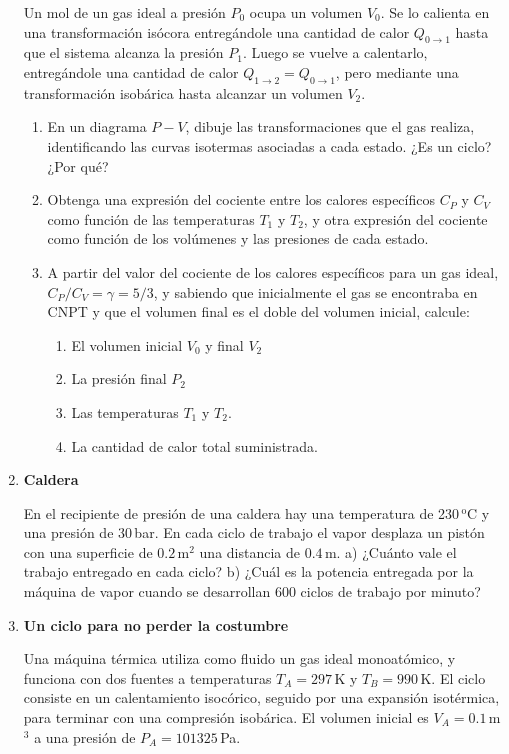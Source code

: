 \documentclass[a4paper,12pt]{article}
\begin{document}
\begin{enumerate}
		Un mol de un gas ideal a presión $P_0$ ocupa un volumen $V_0$. Se lo
		calienta en una transformación isócora entregándole una cantidad de
		calor $Q_{0 \rightarrow 1}$ hasta que el sistema alcanza la presión
		$P_1$. Luego se vuelve a calentarlo, entregándole una cantidad de calor
		$Q_{1 \rightarrow 2} = Q_{0\rightarrow 1}$, pero mediante una
		transformación isobárica hasta alcanzar un volumen $V_2$. 
		\begin{enumerate}
			\item En un diagrama $P-V$, dibuje las transformaciones que el gas
				realiza, identificando las curvas isotermas asociadas a cada
				estado. ¿Es un ciclo? ¿Por qué?
			\item Obtenga una expresión del cociente entre los calores
				específicos $C_P$ y $C_V$ como función de las temperaturas
				$T_1$ y $T_2$, y otra expresión del cociente como función de
				los volúmenes y las presiones de cada estado.
			\item A partir del valor del cociente de los calores específicos
				para un gas ideal, $C_P / C_V = \gamma = 5/3$, y sabiendo que
				inicialmente el gas se encontraba en CNPT y que el volumen
				final es el doble del volumen inicial, calcule:
				\begin{enumerate}
					\item El volumen inicial $V_0$ y final $V_2$
					\item La presión final $P_2$
					\item Las temperaturas $T_1$ y $T_2$. 
					\item La cantidad de calor total suministrada.
				\end{enumerate}
		\end{enumerate}
	
	\item {\bf{Caldera}}
		
		En el recipiente de presión de una caldera hay una temperatura de
		230\,$^\mathrm{o}$C y una presión de 30\,bar. En cada ciclo de trabajo
		el vapor desplaza un pistón con una superficie de $0.2$\,m$^2$ una
		distancia de $0.4$\,m. a) ¿Cuánto vale el trabajo entregado en cada
		ciclo? b) ¿Cuál es la potencia entregada por la máquina de vapor cuando
		se desarrollan 600 ciclos de trabajo por minuto?
	
	\item {\bf{Un ciclo para no perder la costumbre}}
		
		Una máquina térmica utiliza como fluido un gas ideal monoatómico, y
		funciona con dos fuentes a temperaturas $T_A = 297$\,K y $T_B =
		990$\,K. El ciclo consiste en un calentamiento isocórico, seguido por
		una expansión isotérmica, para terminar con una compresión isobárica.
		El volumen inicial es $V_A=0.1$\,m$^3$ a una presión de
		$P_A=101325$\,Pa.
		

\end{enumerate}
\end{document}
